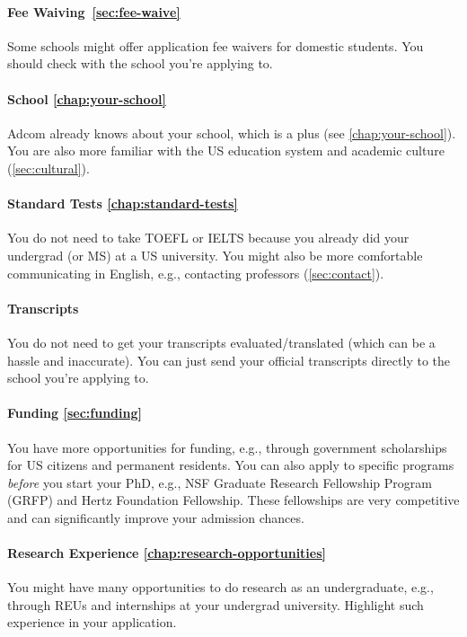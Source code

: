 \documentclass[oneside,11pt,dvipsnames]{book}
\begin{document}
\paragraph{Fee Waiving~\autoref{sec:fee-waive}} Some schools might offer application fee waivers for domestic students.  You should check with the school you're applying to.

\paragraph{School \autoref{chap:your-school}} Adcom already knows about your school, which is a plus (see \autoref{chap:your-school}). You are also more familiar with the US education system and academic culture (\autoref{sec:cultural}).

\paragraph{Standard Tests \autoref{chap:standard-tests}} You do not need to take TOEFL or IELTS because you already did your undergrad (or MS) at a US university.  You might also be more comfortable communicating in English, e.g., contacting professors (\autoref{sec:contact}).

\paragraph{Transcripts} You do not need to get your transcripts evaluated/translated (which can be a hassle and inaccurate).  You can just send your official transcripts directly to the school you're applying to.

\paragraph{Funding \autoref{sec:funding}} You have more opportunities for funding, e.g., through government scholarships for US citizens and permanent residents.  You can also apply to specific programs \emph{before} you start your PhD, e.g., NSF Graduate Research Fellowship Program (GRFP) and Hertz Foundation Fellowship.  These fellowships are very competitive and can significantly improve your admission chances.

\paragraph{Research Experience \autoref{chap:research-opportunities}} You might have many opportunities to do research as an undergraduate, e.g., through REUs and internships at your undergrad university.  Highlight such experience in your application.
\end{document}
